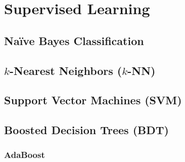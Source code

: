 \section{Supervised Learning}
\label{ml:supervised}

\subsection{N{a\"i}ve Bayes Classification}
\label{ml:supervised:Bayes}

\subsection{\texorpdfstring{$k$}{k}-Nearest Neighbors (\texorpdfstring{$k$}{k}-NN)}
\label{ml:supervised:kNN}

\subsection{Support Vector Machines (SVM)}
\label{ml:supervised:SVM}

\subsection{Boosted Decision Trees (BDT)}
\label{ml:supervised:BDT}


\subsubsection{\xgboost}%
\label{ml:supervised:BDT:xgboost}
\xgboost \cite{xgboost}

\subsubsection{AdaBoost}
\label{ml:supervised:BDT:AdaBoost}

